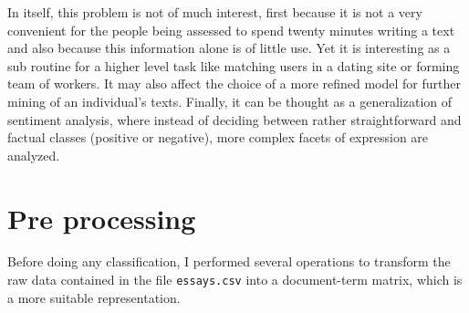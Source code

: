 In itself, this problem is not of much interest, first because it is not a very convenient for the people being assessed to spend twenty minutes writing a text and also because this information alone is of little use. Yet it is interesting as a sub routine for a higher level task like matching users in a dating site or forming team of workers. It may also affect the choice of a more refined model for further mining of an individual's texts. Finally, it can be thought as a generalization of sentiment analysis, where instead of deciding between rather straightforward and factual classes (positive or negative), more complex facets of expression are analyzed.

\section{Pre processing}
\label{sec:preprop}
Before doing any classification, I performed several operations to transform the raw data contained in the file \texttt{essays.csv} into a document-term matrix, which is a more suitable representation.
